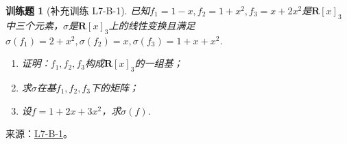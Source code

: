 \documentclass[12pt,fontset=fandol]{ctexart}
\newtheorem{exercise}{训练题}[section]
\begin{document}
\begin{exercise}[补充训练 L7-B-1]\label{prob:L7-B-1}
已知$f_1=1-x,f_2=1+x^2,f_3=x+2x^2$是$\mathbf{R}[x]_3$中三个元素，$\sigma$是$\mathbf{R}[x]_3$上的线性变换且满足$\sigma(f_1)=2+x^2,\sigma(f_2)=x,\sigma(f_3)=1+x+x^2$.
        \begin{enumerate}
            \item 证明：$f_1,f_2,f_3$构成$\mathbf{R}[x]_3$的一组基；

            \item 求$\sigma$在基$f_1,f_2,f_3$下的矩阵；

            \item 设$f=1+2x+3x^2$，求$\sigma(f)$.
        \end{enumerate}
\end{exercise}
\noindent 来源：\href{https://github.com/yhwu-is/Linear-Algebra-Left-Undone/blob/new/%E8%AE%B2%E4%B9%89/%E4%B8%93%E9%A2%98/7%20%E7%BA%BF%E6%80%A7%E6%98%A0%E5%B0%84%E7%9F%A9%E9%98%B5%E8%A1%A8%E7%A4%BA%E4%B8%8E%E7%9F%A9%E9%98%B5%E8%BF%90%E7%AE%97%E5%9F%BA%E7%A1%80.tex}{L7-B-1}。
\end{document}
